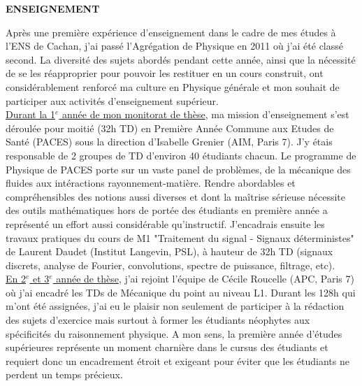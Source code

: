 \documentclass[11pt,onecolumn]{article}
\title{	
\vspace*{-2.5cm}
}
\author{\tiny} %
\date{\tiny }%
\begin{document}


\renewcommand{\headrulewidth}{1pt}
\pagestyle{fancy}
\fancyhf{}
\rhead{}
\rfoot{\thepage / \pageref{LastPage}}
\begin{center}
\Large \textbf{ENSEIGNEMENT}
\end{center}
\normalfont
\vspace*{-0.2cm}
\indent \indent Apr\`es une premi\`ere exp\'erience d'enseignement dans le cadre de mes \'etudes \`a l'ENS de Cachan, j'ai pass\'e l'Agr\'egation de Physique en 2011 o\`u j'ai \'et\'e class\'e second. La diversit\'e des sujets abord\'es pendant cette ann\'ee, ainsi que la n\'ecessit\'e de se les r\'eapproprier pour pouvoir les restituer en un cours construit, ont consid\'erablement renforc\'e ma culture en Physique g\'en\'erale et mon souhait de participer aux activit\'es d'enseignement sup\'erieur.\\
\indent \underline{Durant la 1$^{e}$ ann\'ee de mon monitorat de th\`ese}, ma mission d'enseignement s'est d\'eroul\'ee pour moiti\'e (32h TD) en Premi\`ere Ann\'ee Commune aux Etudes de Sant\'e (PACES) sous la direction d'Isabelle Grenier (AIM, Paris 7). J'y \'etais responsable de 2 groupes de TD d'environ 40 \'etudiants chacun. Le programme de Physique de PACES porte sur un vaste panel de probl\`emes, de la m\'ecanique des fluides aux int\'eractions rayonnement-mati\`ere. Rendre abordables et compr\'ehensibles des notions aussi diverses et dont la ma\^itrise s\'erieuse n\'ecessite des outils math\'ematiques hors de port\'ee des \'etudiants en premi\`ere ann\'ee a repr\'esent\'e un effort aussi consid\'erable qu'instructif. J'encadrais ensuite les travaux pratiques du cours de M1 "Traitement du signal - Signaux d\'eterministes" de Laurent Daudet (Institut Langevin, PSL), \`a hauteur de 32h TD (signaux discrets, analyse de Fourier, convolutions, spectre de puissance, filtrage, etc).\\
\indent \underline{En 2$^{e}$ et 3$^{e}$ année de thèse}, j'ai rejoint l'\'equipe de C\'ecile Roucelle (APC, Paris 7) o\`u j'ai encadr\'e les TDs de M\'ecanique du point au niveau L1. Durant les 128h qui m'ont \'et\'e assign\'ees, j'ai eu le plaisir non seulement de participer \`a la r\'edaction des sujets d'exercice mais surtout \`a former les \'etudiants n\'eophytes aux sp\'ecificit\'es du raisonnement physique. A mon sens, la premi\`ere ann\'ee d'\'etudes sup\'erieures repr\'esente un moment charni\`ere dans le cursus des \'etudiants et requiert donc un encadrement \'etroit et exigeant pour \'eviter que les \'etudiants ne perdent un temps pr\'ecieux.\\
\end{document}

